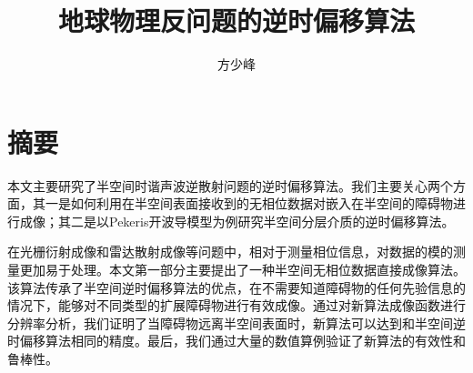   \confidential{}%
  \title[地球物理反问题的逆时偏移算法]{地球物理反问题的逆时偏移算法}%
  \author{方少峰}%
\maketitle
\makeenglishtitle
\makedeclaration
\chapter{摘\quad 要}%
本文主要研究了半空间时谐声波逆散射问题的逆时偏移算法。我们主要关心两个方面，其一是如何利用在半空间表面接收到的无相位数据对嵌入在半空间的障碍物进行成像；其二是以Pekeris开波导模型为例研究半空间分层介质的逆时偏移算法。

在光栅衍射成像和雷达散射成像等问题中，相对于测量相位信息，对数据的模的测量更加易于处理。本文第一部分主要提出了一种半空间无相位数据直接成像算法。 该算法传承了半空间逆时偏移算法的优点，在不需要知道障碍物的任何先验信息的情况下，能够对不同类型的扩展障碍物进行有效成像。通过对新算法成像函数进行分辨率分析，我们证明了当障碍物远离半空间表面时，新算法可以达到和半空间逆时偏移算法相同的精度。最后，我们通过大量的数值算例验证了新算法的有效性和鲁棒性。



